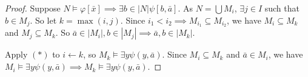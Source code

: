 \documentclass{report}
\begin{document}
\begin{proof}
    Suppose $N \models \varphi[\bar x] \implies \exists b \in |N| \psi[b, \bar a]$. As $N = \bigcup M_i$, $\exists j \in I$ such that $b \in M_j$. So let $k = \max(i, j)$. Since $i_1 < i_2 \implies M_{i_1} \subseteq M_{i_2}$, we have $M_i \subseteq M_k$ and $M_j \subseteq M_k$. So $\bar a\in |M_i|, b \in |M_j| \implies \bar a, b\in |M_k|$. 

    Apply $(*)$ to $i \leftarrow k$, so $M_k \models \exists y \psi(y, \bar a)$. Since $M_i \subseteq M_k$ and $\bar a \in M_i$, we have $M_i \models \exists y \psi(y, \bar a) \implies M_k \models \exists y \psi(y, \bar a)$.
    
\end{proof}

\end{document}
